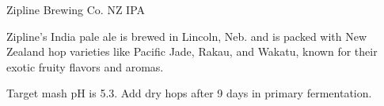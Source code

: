 \begin{recipie}{Zipline Brewing Co. NZ IPA}

\begin{aboutblock}
Zipline's India pale ale is brewed in Lincoln, Neb. and is packed with New Zealand
hop varieties like Pacific Jade, Rakau, and Wakatu, known for their exotic fruity
flavors and aromas.
\end{aboutblock}


\begin{methodandtiming}
 
\begin{mashsteps}
\end{mashsteps}

\begin{directions}
Target mash pH is 5.3. Add dry hops after 9 days in primary fermentation.
\end{directions}

\end{methodandtiming}

\pagebreak

\begin{ingredientsblock}

\begin{malts}
\end{malts}

\begin{hops}
\end{hops}

\begin{yeasts}
\end{yeasts}

\end{ingredientsblock}

\end{recipie}